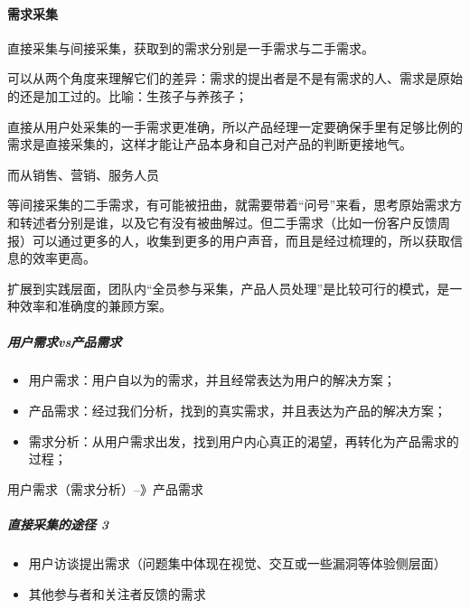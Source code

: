 \documentclass[letterpaper,11pt,english]{sphinxmanual}
\begin{document}
\paragraph{需求采集}
\label{\detokenize{chapter_introduction/need:id5}}
直接采集与间接采集，获取到的需求分别是一手需求与二手需求。

可以从两个角度来理解它们的差异：需求的提出者是不是有需求的人、需求是原始的还是加工过的。比喻：生孩子与养孩子；

直接从用户处采集的一手需求更准确，所以产品经理一定要确保手里有足够比例的需求是直接采集的，这样才能让产品本身和自己对产品的判断更接地气。

而从销售、营销、服务人员%
\begin{footnote}[10]\sphinxAtStartFootnote
{}
%
\end{footnote}等间接采集的二手需求，有可能被扭曲，就需要带着“问号”来看，思考原始需求方和转述者分别是谁，以及它有没有被曲解过。但二手需求（比如一份客户反馈周报）可以通过更多的人，收集到更多的用户声音，而且是经过梳理的，所以获取信息的效率更高。

扩展到实践层面，团队内“全员参与采集，产品人员处理”是比较可行的模式，是一种效率和准确度的兼顾方案。


\subparagraph{用户需求vs产品需求}
\label{\detokenize{chapter_introduction/need:vs}}\begin{itemize}
\item {} 
用户需求：用户自以为的需求，并且经常表达为用户的解决方案；

\item {} 
产品需求：经过我们分析，找到的真实需求，并且表达为产品的解决方案；

\item {} 
需求分析：从用户需求出发，找到用户内心真正的渴望，再转化为产品需求的过程；

\end{itemize}

用户需求\sphinxhyphen{}（需求分析）–》产品需求


\subparagraph{直接采集的途径 3\sphinxfootnotemark[11]}
\label{\detokenize{chapter_introduction/need:id6}}%
\begin{footnotetext}[11]\sphinxAtStartFootnote
{}
%
\end{footnotetext}\ignorespaces \begin{itemize}
\item {} 
用户访谈提出需求（问题集中体现在视觉、交互或一些漏洞等体验侧层面）

\item {} 
其他参与者和关注者反馈的需求

\end{itemize}
\end{document}
